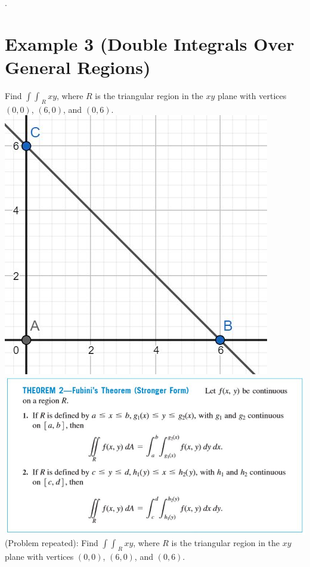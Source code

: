 \documentclass[11pt]{article}
\begin{document}
\newpage

.

\newpage

\section*{Example 3 (Double Integrals Over General Regions)}

Find $\int \int_{\; R} xy$, where $R$ is the triangular region in the $xy$ plane with vertices $(0,0)$, $(6,0)$, and $(0,6)$. \\

\includegraphics{Capture3.jpg}\\
\includegraphics{Capture2.jpg}\\

(Problem repeated): Find $\int \int_{\; R} xy$, where $R$ is the triangular region in the $xy$ plane with vertices $(0,0)$, $(6,0)$, and $(0,6)$. \\
\end{document}
